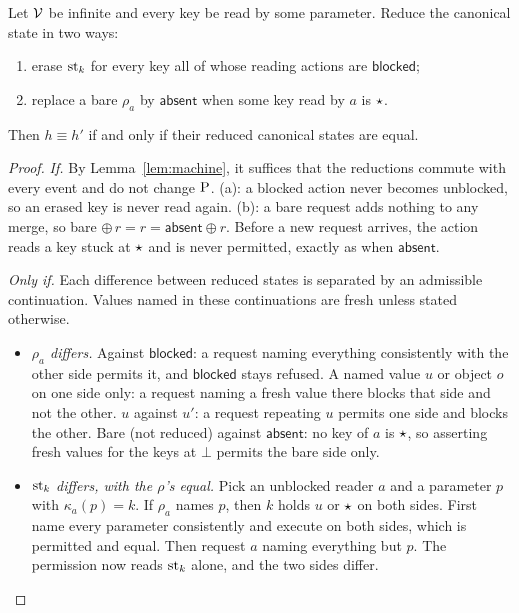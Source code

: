 \begin{theorem}\label{thm:exact}
Let $\mathcal{V}$ be infinite and every key be read by some parameter. Reduce the canonical state in two
ways:
\begin{enumerate}
\item[(a)] erase $\mathrm{st}_k$ for every key all of whose reading actions are $\mathsf{blocked}$;
\item[(b)] replace a bare $\rho_a$ by $\mathsf{absent}$ when some key read by $a$ is $\star$.
\end{enumerate}
Then $h \equiv h'$ if and only if their reduced canonical states are equal.
\end{theorem}
\begin{proof}[Proof]
\emph{If.} By Lemma~\ref{lem:machine}, it suffices that the reductions commute with every event
and do not change $\mathrm{P}$. (a): a blocked action never becomes unblocked, so an erased key is
never read again. (b): a bare request adds nothing to any merge, so bare $\oplus\, r = r =
\mathsf{absent} \oplus r$. Before a new request arrives, the action reads a key stuck at
$\star$ and is never permitted, exactly as when $\mathsf{absent}$.

\emph{Only if.} Each difference between reduced states is separated by an admissible
continuation. Values named in these continuations are fresh unless stated otherwise.
\begin{itemize}
\item \emph{$\rho_a$ differs.} Against $\mathsf{blocked}$: a request naming everything
  consistently with the other side permits it, and $\mathsf{blocked}$ stays refused. A named
  value $u$ or object $o$ on one side only: a request naming a fresh value there blocks that
  side and not the other. $u$ against $u'$: a request repeating $u$ permits one side and blocks
  the other. Bare (not reduced) against $\mathsf{absent}$: no key of $a$ is $\star$, so
  asserting fresh values for the keys at $\bot$ permits the bare side only.
\item \emph{$\mathrm{st}_k$ differs, with the $\rho$'s equal.} Pick an unblocked reader $a$ and a
  parameter $p$ with $\kappa_a(p) = k$. If $\rho_a$ names $p$, then $k$ holds $u$ or $\star$
  on both sides. First name every parameter consistently and execute on both sides, which is
  permitted and equal. Then request $a$ naming everything but $p$. The permission now reads
  $\mathrm{st}_k$ alone, and the two sides differ.
\end{itemize}
\end{proof}

